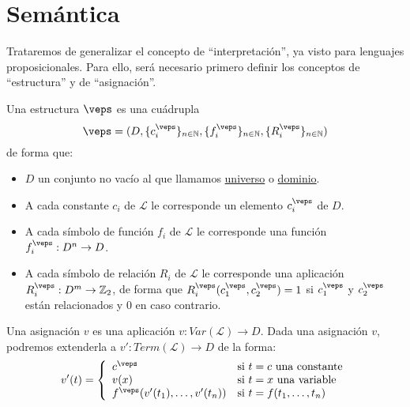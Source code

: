 \section{Semántica}
Trataremos de generalizar el concepto de ``interpretación'', ya visto para lenguajes proposicionales. Para ello, será necesario primero definir los conceptos de ``estructura'' y de ``asignación''.

\begin{definicion}[Estructura]
    Una estructura $\veps$ es una cuádrupla
    \begin{equation*}
        \veps = (D, \{c_i^\veps\}_{n\in \mathbb{N}}, \{f_i^\veps\}_{n\in \mathbb{N}}, \{R_i^\veps\}_{n\in \mathbb{N}})
    \end{equation*}
    de forma que:
    \begin{itemize}
        \item $D$ un conjunto no vacío al que llamamos \underline{universo} o \underline{dominio}.
        \item A cada constante $c_i$ de $\mathcal{L}$ le corresponde un elemento $c_i^{\veps}$ de $D$.
        \item A cada símbolo de función $f_i$ de $\mathcal{L}$ le corresponde una función $f_i^\veps:D^n\to D$.
        \item A cada símbolo de relación $R_i$ de $\mathcal{L}$ le corresponde una aplicación ${R_i^\veps:D^m\to\mathbb{Z}_2}$, de forma que $R_i^\veps(c_1^\veps,c_2^\veps)=1$ si $c_1^\veps$ y $c_2^\veps$ están relacionados y 0 en caso contrario.
    \end{itemize}
\end{definicion}

\begin{definicion}[Asignación]
    Una asignación $v$ es una aplicación $v:Var(\mathcal{L})\to D$. Dada una asignación $v$, podremos extenderla a $v':Term(\mathcal{L})\to D$ de la forma:
    \begin{equation*}
        v'(t) = \left\{\begin{array}{ll}
                c^\veps & \text{si\ } t=c \text{\ una constante} \\
                v(x) & \text{si\ } t=x \text{\ una variable} \\
                f^\veps(v'(t_1),\ldots,v'(t_n)) &\text{si\ } t=f(t_1,\ldots,t_n)
        \end{array}\right.
    \end{equation*}
\end{definicion}

